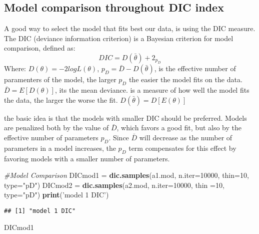 \documentclass[]{article}
\newenvironment{Shaded}{\begin{snugshade}}{\end{snugshade}}
\newcommand{\KeywordTok}[1]{\textcolor[rgb]{0.13,0.29,0.53}{\textbf{#1}}}
\newcommand{\DataTypeTok}[1]{\textcolor[rgb]{0.13,0.29,0.53}{#1}}
\newcommand{\DecValTok}[1]{\textcolor[rgb]{0.00,0.00,0.81}{#1}}
\newcommand{\StringTok}[1]{\textcolor[rgb]{0.31,0.60,0.02}{#1}}
\newcommand{\CommentTok}[1]{\textcolor[rgb]{0.56,0.35,0.01}{\textit{#1}}}
\newcommand{\NormalTok}[1]{#1}
\begin{document}
\subsection{Model comparison throughout DIC
index}\label{model-comparison-throughout-dic-index}

A good way to select the model that fits best our data, is using the DIC
measure. The DIC (deviance information criterion) is a Bayesian
criterion for model comparison, defined as:
\[ DIC = D(\bar{\theta}) + 2_{p_D}\] Where:
\(D(\theta) = -2logL(\theta)\), \(p_D = \bar D - D(\bar \theta)\), is
the effective number of paramenters of the model, the larger \(p_D\) the
easier the model fits on the data. \(\bar D = E[D(\theta)]\), its the
mean deviance. is a measure of how well the model fits the data, the
larger the worse the fit. \(D(\bar \theta) = D[E(\theta)]\)

the basic idea is that the models with smaller DIC should be preferred.
Models are penalized both by the value of \(\bar D\), which favors a
good fit, but also by the effective number of parameters \(p_D\). Since
\(\bar D\) will decrease as the number of parameters in a model
increases, the \(p_{D}\) term compensates for this effect by favoring
models with a smaller number of parameters.

\begin{Shaded}
\begin{Highlighting}[]
\CommentTok{#Model Comparison}
\NormalTok{DICmod1 =}\StringTok{ }\KeywordTok{dic.samples}\NormalTok{(a1.mod, }\DataTypeTok{n.iter=}\DecValTok{10000}\NormalTok{, }\DataTypeTok{thin=}\DecValTok{10}\NormalTok{, }\DataTypeTok{type=}\StringTok{"pD"}\NormalTok{)}
\NormalTok{DICmod2 =}\StringTok{ }\KeywordTok{dic.samples}\NormalTok{(a2.mod, }\DataTypeTok{n.iter=}\DecValTok{10000}\NormalTok{, }\DataTypeTok{thin =}\DecValTok{10}\NormalTok{, }\DataTypeTok{type=}\StringTok{"pD"}\NormalTok{)}
\KeywordTok{print}\NormalTok{(}\StringTok{'model 1 DIC'}\NormalTok{)}
\end{Highlighting}
\end{Shaded}

\begin{verbatim}
## [1] "model 1 DIC"
\end{verbatim}

\begin{Shaded}
\begin{Highlighting}[]
\NormalTok{DICmod1}
\end{Highlighting}
\end{Shaded}
\end{document}
